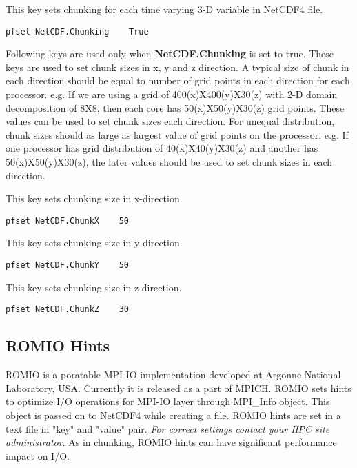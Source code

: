 {This key sets chunking for each time varying 3-D variable in NetCDF4 file.}
\begin{display}\begin{verbatim}
pfset NetCDF.Chunking    True
\end{verbatim}\end{display}

Following keys are used only when \textbf{NetCDF.Chunking} is set to true. These keys are used to set chunk sizes in x, y and z direction. A typical size of chunk in each direction should be equal to number of grid points in each direction for each processor. e.g. If we are using a grid of 400(x)X400(y)X30(z) with 2-D domain decomposition of 8X8, then each core has 50(x)X50(y)X30(z) grid points. These values can be used to set chunk sizes each direction. For unequal distribution, chunk sizes should as large as largest value of grid points on the processor. e.g. If one processor has grid distribution of 40(x)X40(y)X30(z) and another has 50(x)X50(y)X30(z), the later values should be used to set chunk sizes in each direction.

{This key sets chunking size in x-direction.}
\begin{display}\begin{verbatim}
pfset NetCDF.ChunkX    50
\end{verbatim}\end{display}

{This key sets chunking size in y-direction.}
\begin{display}\begin{verbatim}
pfset NetCDF.ChunkY    50
\end{verbatim}\end{display}

{This key sets chunking size in z-direction.}
\begin{display}\begin{verbatim}
pfset NetCDF.ChunkZ    30
\end{verbatim}\end{display}

\subsection{ROMIO Hints}
ROMIO is a poratable MPI-IO implementation developed at Argonne National Laboratory, USA. Currently it is released as a part of MPICH. ROMIO sets hints to optimize I/O operations for MPI-IO layer through MPI\_Info object. This object is passed on to NetCDF4 while creating a file. ROMIO hints are set in a text file in "key" and "value" pair. \textit{For correct settings contact your HPC site administrator}. As in chunking, ROMIO hints can have significant performance impact on I/O.

